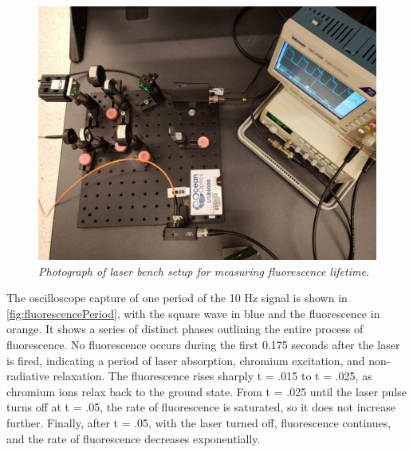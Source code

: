 \documentclass[11pt, a4paper, twocolumn]{article}
\begin{document}
\begin{figure}[]
\includegraphics[width=\linewidth, height=\linewidth]{laserBenchPhoto.png}
\caption{\textit{Photograph of laser bench setup for measuring fluorescence lifetime.
}}
\label{fig:laserBenchPhoto}
\end{figure}

The oscilloscope capture of one period of the 10 Hz signal is shown in \ref{fig:fluorescencePeriod}, with the square  wave  in  blue  and  the  fluorescence  in  orange. 
It shows a series of distinct phases outlining the entire process of fluorescence. No fluorescence occurs during the first 0.175 seconds after the laser is fired, indicating a period of laser absorption, chromium excitation, and non-radiative relaxation. The fluorescence rises sharply t = .015 to t = .025, as chromium ions relax back to the ground state. From t = .025 until the laser pulse turns off at t = .05, the rate of fluorescence is saturated, so it does not increase further. Finally, after t = .05, with the laser turned off, fluorescence continues, and the rate of fluorescence decreases exponentially. 
\end{document}
